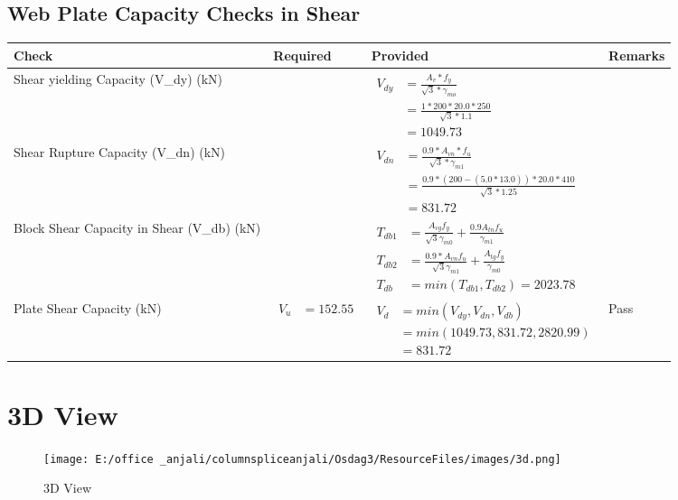 \documentclass{article}%
\begin{document}
\subsection{Web Plate Capacity Checks in Shear}%
\label{subsec:WebPlateCapacityChecksinShear}%
\renewcommand{\arraystretch}{1.2}%
\begin{longtable}{|p{4cm}|p{6cm}|p{5.5cm}|p{1.5cm}|}%
\hline%
\rowcolor{OsdagGreen}%
Check&Required&Provided&Remarks\\%
\hline%
\endhead%
\hline%
Shear yielding Capacity (V\_dy) (kN)&&$\begin{aligned} V_{dy} &= \frac{A_v*f_y}{\sqrt{3}*\gamma_{mo}}\\ &=\frac{1*200*20.0*250}{\sqrt{3}*1.1}\\ &=1049.73\end{aligned}$&\\%
\hline%
Shear Rupture Capacity (V\_dn) (kN)&&$\begin{aligned} V_{dn} &= \frac{0.9*A_{vn}*f_u}{\sqrt{3}*\gamma_{m1}}\\ &= \frac{0.9 *(200-(5.0*13.0))*20.0*410}{\sqrt{3}*1.25}\\ &=831.72\end{aligned}$&\\%
\hline%
Block Shear Capacity in Shear (V\_db) (kN)&&$\begin{aligned}T_{db1} &= \frac{A_{vg} f_{y}}{\sqrt{3} \gamma_{m0}} + \frac{0.9 A_{tn} f_{u}}{\gamma_{m1}}\\ T_{db2} &= \frac{0.9*A_{vn} f_{u}}{\sqrt{3} \gamma_{m1}} + \frac{A_{tg} f_{y}}{\gamma_{m0}}\\ T_{db} &= min(T_{db1}, T_{db2})= 2023.78\end{aligned}$&\\%
\hline%
Plate Shear Capacity (kN)&$\begin{aligned} V_u &=152.55\end{aligned}$&$\begin{aligned} V_d &= min(V_{dy},V_{dn},V_{db})\\ &= min(1049.73,831.72,2820.99)\\ &=831.72\end{aligned}$&Pass\\%
\hline%
\end{longtable}

%
%
\newpage%
\section{3D View}%
\label{sec:3DView}%


\begin{figure}[h!]%
\centering%
\texttt{[image: E:/office \_anjali/columnspliceanjali/Osdag3/ResourceFiles/images/3d.png]}%
\caption{3D View}%
\end{figure}

%
\end{document}
